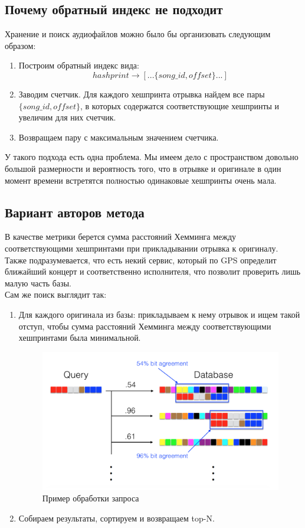 \subsection{Почему обратный индекс не подходит}
Хранение и поиск аудиофайлов можно было бы организовать следующим образом:
\begin{enumerate}[label=\arabic*.]
    \item Построим обратный индекс вида:
    $$hashprint \to [...\{song\_id, offset\}...]$$
    \item Заводим счетчик. Для каждого хешпринта отрывка
    найдем все пары $\{song\_id, offset\}$, в которых содержатся
    соответствующие хешпринты и увеличим для них счетчик.
    \item Возвращаем пару с максимальным значением счетчика.
\end{enumerate}
У такого подхода есть одна проблема. Мы имеем дело с пространством довольно
большой размерности и вероятность того, что в отрывке и оригинале в один момент времени
встретятся полностью одинаковые хешпринты очень мала.

\subsection{Вариант авторов метода}
В качестве метрики берется сумма расстояний Хемминга между соответствующими хешпринтами
при прикладывании отрывка к оригиналу.
Также подразумевается, что есть некий сервис, который по GPS определит
ближайший концерт и соответственно исполнителя, что позволит проверить лишь малую часть базы.\\
Сам же поиск выглядит так:
\begin{enumerate}[label=\arabic*.]
    \item Для каждого оригинала из базы: прикладываем к нему отрывок и ищем такой отступ, чтобы сумма расстояний
    Хемминга между соответствующими хешпринтами была минимальной.
    \begin{figure}[H]
        \begin{center}
            \includegraphics[scale=0.5]{inc/img/query.png}
            \caption{Пример обработки запроса}
        \end{center}
    \end{figure}
    \item Собираем результаты, сортируем и возвращаем top-N.
\end{enumerate}

